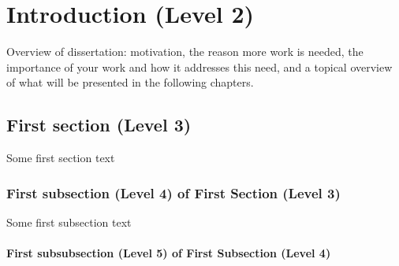 \chapter[Intro]{Introduction (Level 2)}\label{chap:intro}

Overview of dissertation: motivation, the reason more work is needed, the importance of your work and how it addresses this need, and a topical overview of what will be presented in the following chapters.

\section{First section (Level 3)}

Some first section text
\subsection{First subsection (Level 4) of First Section (Level 3)}

Some first subsection text
\subsubsection{First subsubsection (Level 5) of First Subsection (Level 4)}

